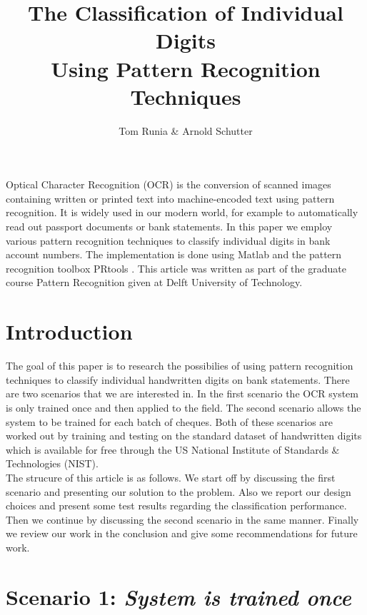 \documentclass{article}
\begin{document}
\title{The Classification of Individual Digits \\ Using Pattern Recognition Techniques}
\author{Tom Runia \& Arnold Schutter}

\maketitle

Optical Character Recognition (OCR) is the conversion of scanned images containing written or printed text into machine-encoded text using pattern recognition. It is widely used in our modern world, for example to automatically read out passport documents or bank statements. In this paper we employ various pattern recognition techniques to classify individual digits in bank account numbers. The implementation is done using Matlab and the pattern recognition toolbox PRtools \cite{prtools-manual}. This article was written as part of the graduate course Pattern Recognition given at Delft University of Technology.

\section{Introduction}
The goal of this paper is to research the possibilies of using pattern recognition techniques to classify individual handwritten digits on bank statements. There are two scenarios that we are interested in. In the first scenario the OCR system is only trained once and then applied to the field. The second scenario allows the system to be trained for each batch of cheques. Both of these scenarios are worked out by training and testing on the standard dataset of handwritten digits which is available for free through the US National Institute of Standards \& Technologies (NIST). \\

The strucure of this article is as follows. We start off by discussing the first scenario and presenting our solution to the problem. Also we report our design choices and present some test results regarding the classification performance. Then we continue by discussing the second scenario in the same manner. Finally we review our work in the conclusion and give some recommendations for future work.

\section{Scenario 1: \textit{System is trained once}}
\end{document}
